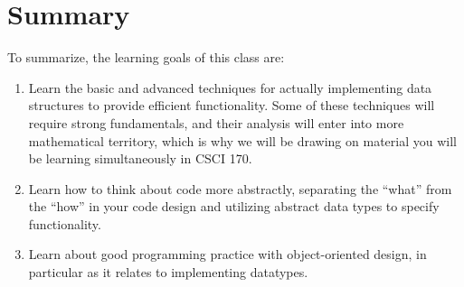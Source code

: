\section{Summary}

To summarize, the learning goals of this class are:
\begin{enumerate}
\item Learn the basic and advanced techniques for actually
  implementing data structures to provide efficient functionality.
  Some of these techniques will require strong fundamentals,
  and their analysis will enter into more mathematical territory,
  which is why we will be drawing on material you will be learning
  simultaneously in CSCI 170.
\item Learn how to think about code more abstractly, separating the
  ``what'' from the ``how'' in your code design and utilizing abstract
  data types to specify functionality.
\item Learn about good programming practice with object-oriented
  design, in particular as it relates to implementing datatypes.
\end{enumerate}
